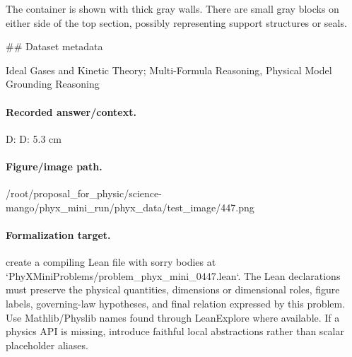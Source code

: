 The container is shown with thick gray walls. There are small gray blocks on either side of the top section, possibly representing support structures or seals.

\#\# Dataset metadata

Ideal Gases and Kinetic Theory; Multi-Formula Reasoning, Physical Model Grounding Reasoning

\paragraph{Recorded answer/context.}
D: D: 5.3 cm

\paragraph{Figure/image path.}
/root/proposal\_for\_physic/science-mango/phyx\_mini\_run/phyx\_data/test\_image/447.png

\paragraph{Formalization target.}
create a compiling Lean file with sorry bodies at `PhyXMiniProblems/problem\_phyx\_mini\_0447.lean`. The Lean declarations must preserve the physical quantities, dimensions or dimensional roles, figure labels, governing-law hypotheses, and final relation expressed by this problem.
Use Mathlib/Physlib names found through LeanExplore where available. If a physics API is missing, introduce faithful local abstractions rather than scalar placeholder aliases.

